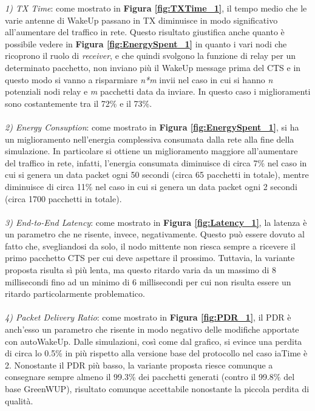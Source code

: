 \textit{1) TX Time}: come mostrato in \textbf{Figura \ref{fig:TXTime_1}}, il tempo medio che le varie antenne di WakeUp passano in TX diminuisce in modo significativo all'aumentare del traffico in rete. Questo risultato giustifica anche quanto è possibile vedere in \textbf{Figura \ref{fig:EnergySpent_1}} in quanto  i vari nodi che ricoprono il ruolo di \textit{receiver}, e che quindi svolgono la funzione di relay per un determinato pacchetto, non inviano più il WakeUp message prima del CTS e in questo modo si vanno a risparmiare \textit{n*m} invii nel caso in cui si hanno \textit{n} potenziali nodi relay e \textit{m} pacchetti data da inviare. In questo caso i miglioramenti sono costantemente tra il 72\% e il 73\%.
\\\\
\textit{2) Energy Consuption}: come mostrato in \textbf{Figura \ref{fig:EnergySpent_1}}, si ha un miglioramento nell'energia complessiva consumata dalla rete alla fine della simulazione. In particolare si ottiene un miglioramento maggiore all'aumentare del traffico in rete, infatti, l'energia consumata diminuisce di circa 7\% nel caso in cui si genera un data packet ogni 50 secondi (circa 65 pacchetti in totale), mentre diminuisce di circa 11\% nel caso in cui si genera un data packet ogni 2 secondi (circa 1700 pacchetti in totale).
\\\\
\textit{3) End-to-End Latency}: come mostrato in \textbf{Figura \ref{fig:Latency_1}}, la latenza è un parametro che ne risente, invece, negativamente. Questo può essere dovuto al fatto che, svegliandosi da solo, il nodo mittente non riesca sempre a ricevere il primo pacchetto CTS per cui deve aspettare il prossimo. Tuttavia, la variante proposta risulta sì più lenta, ma questo ritardo varia da un massimo di 8 millisecondi fino ad un minimo di 6 millisecondi per cui non risulta essere un ritardo particolarmente problematico.
\\\\
\textit{4) Packet Delivery Ratio}: come mostrato in \textbf{Figura \ref{fig:PDR_1}}, il PDR è anch'esso un parametro che risente in modo negativo delle modifiche apportate con autoWakeUp. Dalle simulazioni, così come dal grafico, si evince una perdita di circa lo 0.5\% in più rispetto alla versione base del protocollo nel caso iaTime è 2. Nonostante il PDR più basso, la variante proposta riesce comunque a consegnare sempre almeno il 99.3\% dei pacchetti generati (contro il 99.8\% del base GreenWUP), risultato comunque accettabile nonostante la piccola perdita di qualità.

